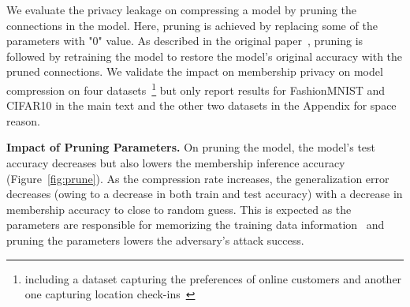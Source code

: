 We evaluate the privacy leakage on compressing a model by pruning the connections in the model.
Here, pruning is achieved by replacing some of the parameters with "0" value.
As described in the original paper~\cite{Han:2015:LBW:2969239.2969366,DBLP:journals/corr/HanPNMTECTD16}, pruning is followed by retraining the model to restore the model's original accuracy with the pruned connections.
We validate the impact on membership privacy on model compression on four datasets~\footnote{including a dataset capturing the preferences of online customers and  another one capturing location check-ins~\cite{shokri2017membership}} but only report results for FashionMNIST and CIFAR10 in the main text and the other two datasets in the Appendix for space reason.

\textbf{Impact of Pruning Parameters.} On pruning the model, the model's test accuracy decreases but also lowers the membership inference accuracy (Figure~\ref{fig:prune}). %
As the compression rate increases, the generalization error decreases (owing to a decrease in both train and test accuracy) with a decrease in membership accuracy to close to random guess.
This is expected as the parameters are responsible for memorizing the training data information~\cite{DBLP:journals/corr/abs-1812-00910,236216,10.1145/3133956.3134077} and pruning the parameters lowers the adversary's attack success.




%


